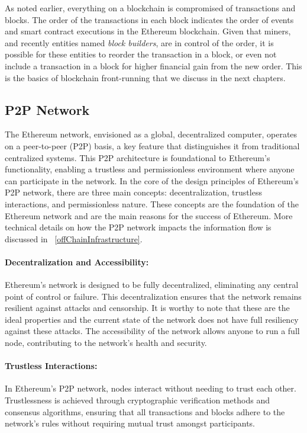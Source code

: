 As noted earlier, everything on a blockchain is compromised of transactions and blocks. The order of the transactions in each block indicates the order of events and smart contract executions in the Ethereum blockchain. Given that miners, and recently entities named \textit{block builders}, are in control of the order, it is possible for these entities to reorder the transaction in a block, or even not include a transaction in a block for higher financial gain from the new order. This is the basics of blockchain front-running that we discuss in the next chapters. 


\subsection{P2P Network}
The Ethereum network, envisioned as a global, decentralized computer, operates on a peer-to-peer (P2P) basis, a key feature that distinguishes it from traditional centralized systems. This P2P architecture is foundational to Ethereum's functionality, enabling a trustless and permissionless environment where anyone can participate in the network. In the core of the design principles of Ethereum's P2P network, there are three main concepts: decentralization, trustless interactions, and permissionless nature. These concepts are the foundation of the Ethereum network and are the main reasons for the success of Ethereum. More technical details on how the P2P network impacts the information flow is discussed in ~\ref{offChainInfrastructure}.

\paragraph{Decentralization and Accessibility:} Ethereum's network is designed to be fully decentralized, eliminating any central point of control or failure. This decentralization ensures that the network remains resilient against attacks and censorship. It is worthy to note that these are the ideal properties and the current state of the network does not have full resiliency against these attacks. The accessibility of the network allows anyone to run a full node, contributing to the network's health and security.

\paragraph{Trustless Interactions:} In Ethereum's P2P network, nodes interact without needing to trust each other. Trustlessness is achieved through cryptographic verification methods and consensus algorithms, ensuring that all transactions and blocks adhere to the network's rules without requiring mutual trust amongst participants.

